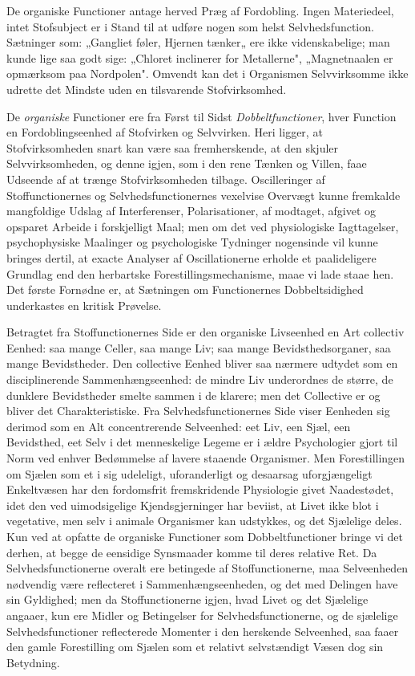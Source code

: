 \documentclass[12pt]{article}
\newcommand{\opage}[1]{\marginnote{\footnotesize\textit{[#1]}}}
\begin{document}
De organiske Functioner antage herved Præg af Fordobling. Ingen
Materiedeel, intet Stofsubject er i Stand til at udføre nogen som
helst Selvhedsfunction. Sætninger som: „Gangliet føler, Hjernen
tænker„ ere ikke videnskabelige; man kunde lige saa godt sige:
„Chloret inclinerer for Metallerne", „Magnetnaalen er opmærksom paa
Nordpolen". Omvendt kan det i Organismen Selvvirksomme ikke udrette
det Mindste uden en tilsvarende Stofvirksomhed.

De \emph{organiske} Functioner ere fra Først til Sidst
\emph{Dobbeltfunctioner}, hver Function en Fordoblingseenhed af
Stofvirken og Selvvirken. Heri ligger, at Stofvirksomheden snart kan
være saa fremherskende, at den skjuler Selvvirksomheden, og denne
igjen, som i den rene Tænken og Villen, faae Udseende af at trænge
Stofvirksomheden tilbage. Oscilleringer af Stoffunctionernes og
Selvhedsfunctionernes vexelvise Overvægt kunne fremkalde mangfoldige
Udslag af Interferenser, Polarisationer, af modtaget, afgivet og
opsparet Arbeide i forskjelligt Maal; men om det ved physiologiske
Iagttagelser, psychophysiske Maalinger og psychologiske Tydninger
nogensinde
\opage{59} vil kunne bringes dertil, at exacte Analyser af Oscillationerne
erholde et paalideligere Grundlag end den herbartske
Forestillingsmechanisme, maae vi lade staae hen. Det første Fornødne
er, at Sætningen om Functionernes Dobbeltsidighed underkastes en
kritisk Prøvelse.

Betragtet fra Stoffunctionernes Side er den organiske Livseenhed en
Art collectiv Eenhed: saa mange Celler, saa mange Liv; saa mange
Bevidsthedsorganer, saa mange Bevidstheder. Den collective Eenhed
bliver saa nærmere udtydet som en disciplinerende
Sammenhængseenhed: de mindre Liv underordnes de større, de dunklere
Bevidstheder smelte sammen i de klarere; men det Collective er og
bliver det Charakteristiske. Fra Selvhedsfunctionernes Side viser
Eenheden sig derimod som en Alt concentrerende Selveenhed: eet Liv,
een Sjæl, een Bevidsthed, eet Selv i det menneskelige Legeme er i
ældre Psychologier gjort til Norm ved enhver Bedømmelse af lavere
staaende Organismer. Men Forestillingen om Sjælen som et i sig
udeleligt, uforanderligt og desaarsag uforgjængeligt Enkeltvæsen har
den fordomsfrit fremskridende Physiologie givet Naadestødet, idet
den ved uimodsigelige Kjendsgjerninger har beviist, at Livet ikke
blot i vegetative, men selv i animale Organismer kan udstykkes, og
det Sjælelige deles. Kun ved at opfatte de organiske Functioner som
Dobbeltfunctioner bringe vi det derhen, at begge de eensidige
Synsmaader komme til deres relative Ret. Da Selvhedsfunctionerne
overalt ere betingede af Stoffunctionerne, maa Selveenheden
nødvendig være reflecteret i Sammenhængseenheden, og det med
Delingen have sin Gyldighed; men da Stoffunctionerne igjen, hvad
Livet og det Sjælelige angaaer, kun ere Midler og Betingelser for
Selvhedsfunctionerne, og de sjælelige Selvhedsfunctioner
reflecterede Momenter i den herskende Selveenhed, saa faaer den
gamle Forestilling om Sjælen som et relativt selvstændigt Væsen dog
sin Betydning.
\end{document}
